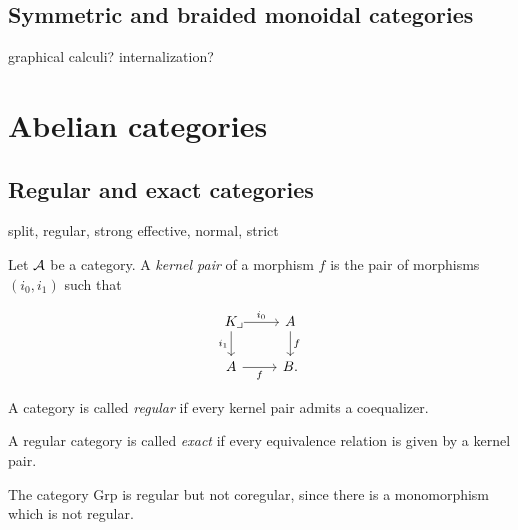 \documentclass{../../large}
\begin{document}
\section{Symmetric and braided monoidal categories}

\begin{prb}
\end{prb}

\begin{prb}
\end{prb}

\begin{prb}
\end{prb}

graphical calculi?
internalization?


\chapter{Abelian categories}
\section{Regular and exact categories}

split, regular, strong
effective, normal, strict

\begin{prb}
Let $\mathcal{A}$ be a category.
A \emph{kernel pair} of a morphism $f$ is the pair of morphisms $(i_0,i_1)$ such that

\[\begin{tikzcd}[execute at end picture={\node[label={[below right]:$\lrcorner$}]at(\tikzcdmatrixname-1-1){};}]
K \rar{i_0}\dar[swap]{i_1} & A \dar{f} \\
A \rar[swap]{f} & B.
\end{tikzcd}\]
\end{prb}


A category is called \emph{regular} if every kernel pair admits a coequalizer.

\begin{prb}
A regular category is called \emph{exact} if every equivalence relation is given by a kernel pair.
\begin{parts}
\item
\end{parts}
\end{prb}

The category $\mathrm{Grp}$ is regular but not coregular, since there is a monomorphism which is not regular.
\end{document}
